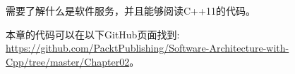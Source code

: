 需要了解什么是软件服务，并且能够阅读C++11的代码。

本章的代码可以在以下GitHub页面找到: \url{https://github.com/PacktPublishing/Software-Architecture-with-Cpp/tree/master/Chapter02}。